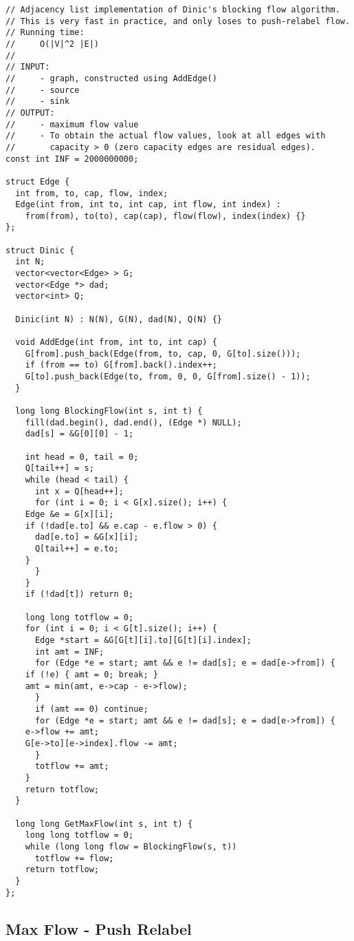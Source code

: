 \documentclass[10pt,letterpaper,twocolumn,twosided]{article}
\begin{document}
\begin{lstlisting}
// Adjacency list implementation of Dinic's blocking flow algorithm.
// This is very fast in practice, and only loses to push-relabel flow.
// Running time:
//     O(|V|^2 |E|)
//
// INPUT: 
//     - graph, constructed using AddEdge()
//     - source
//     - sink
// OUTPUT:
//     - maximum flow value
//     - To obtain the actual flow values, look at all edges with
//       capacity > 0 (zero capacity edges are residual edges).
const int INF = 2000000000;

struct Edge {
  int from, to, cap, flow, index;
  Edge(int from, int to, int cap, int flow, int index) :
    from(from), to(to), cap(cap), flow(flow), index(index) {}
};

struct Dinic {
  int N;
  vector<vector<Edge> > G;
  vector<Edge *> dad;
  vector<int> Q;
  
  Dinic(int N) : N(N), G(N), dad(N), Q(N) {}
  
  void AddEdge(int from, int to, int cap) {
    G[from].push_back(Edge(from, to, cap, 0, G[to].size()));
    if (from == to) G[from].back().index++;
    G[to].push_back(Edge(to, from, 0, 0, G[from].size() - 1));
  }

  long long BlockingFlow(int s, int t) {
    fill(dad.begin(), dad.end(), (Edge *) NULL);
    dad[s] = &G[0][0] - 1;
    
    int head = 0, tail = 0;
    Q[tail++] = s;
    while (head < tail) {
      int x = Q[head++];
      for (int i = 0; i < G[x].size(); i++) {
	Edge &e = G[x][i];
	if (!dad[e.to] && e.cap - e.flow > 0) {
	  dad[e.to] = &G[x][i];
	  Q[tail++] = e.to;
	}
      }
    }
    if (!dad[t]) return 0;

    long long totflow = 0;
    for (int i = 0; i < G[t].size(); i++) {
      Edge *start = &G[G[t][i].to][G[t][i].index];
      int amt = INF;
      for (Edge *e = start; amt && e != dad[s]; e = dad[e->from]) {
	if (!e) { amt = 0; break; }
	amt = min(amt, e->cap - e->flow);
      }
      if (amt == 0) continue;
      for (Edge *e = start; amt && e != dad[s]; e = dad[e->from]) {
	e->flow += amt;
	G[e->to][e->index].flow -= amt;
      }
      totflow += amt;
    }
    return totflow;
  }

  long long GetMaxFlow(int s, int t) {
    long long totflow = 0;
    while (long long flow = BlockingFlow(s, t))
      totflow += flow;
    return totflow;
  }
};

\end{lstlisting}

\subsection{Max Flow - Push Relabel}
\end{document}
